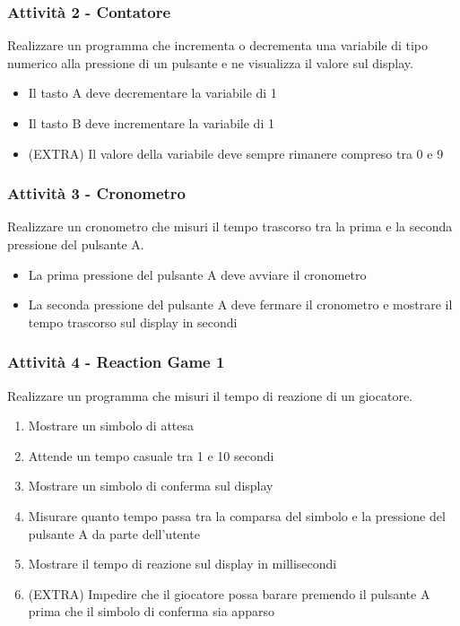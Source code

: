 \documentclass{beamer}
\begin{document}
\begin{frame}
	\frametitle{Attività 2 - Contatore}

	Realizzare un programma che incrementa o decrementa una variabile di tipo numerico alla pressione di un pulsante e ne visualizza il valore sul display.

	\vspace{2em}
	\begin{itemize}
		\item Il tasto A deve decrementare la variabile di 1
		\item Il tasto B deve incrementare la variabile di 1
		\item (EXTRA) Il valore della variabile deve sempre rimanere compreso tra 0 e 9
	\end{itemize}
	

\end{frame}

\begin{frame}
	\frametitle{Attività 3 - Cronometro}

	Realizzare un cronometro che misuri il tempo trascorso tra la prima e la seconda pressione del pulsante A.

	\vspace{2em}
	\begin{itemize}
		\item La prima pressione del pulsante A deve avviare il cronometro
		\item La seconda pressione del pulsante A deve fermare il cronometro e mostrare il tempo trascorso sul display in secondi
	\end{itemize}
\end{frame}

\begin{frame}
	\frametitle{Attività 4 - Reaction Game 1}
	Realizzare un programma che misuri il tempo di reazione di un giocatore.
	\vspace{2em}
	\begin{enumerate}
		\item Mostrare un simbolo di attesa
		\item Attende un tempo casuale tra 1 e 10 secondi
		\item Mostrare un simbolo di conferma sul display
		\item Misurare quanto tempo passa tra la comparsa del simbolo e la pressione del pulsante A da parte dell'utente
		\item Mostrare il tempo di reazione sul display in millisecondi
		\item (EXTRA) Impedire che il giocatore possa barare premendo il pulsante A prima che il simbolo di conferma sia apparso
	\end{enumerate}	
\end{frame}
\end{document}
